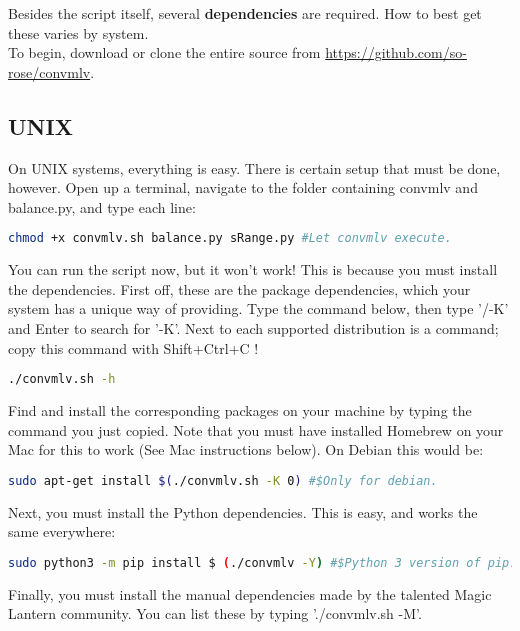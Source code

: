 \documentclass[a4paper,12pt]{article}
\begin{document}
		Besides the script itself, several \textbf{dependencies} are required. How to best get these varies by system.\\
		
		To begin, download or clone the entire source from \url{https://github.com/so-rose/convmlv}.
		
	\subsection{UNIX}
		On UNIX systems, everything is easy. There is certain setup that must be done, however. Open up a terminal, navigate to the folder containing
		convmlv and balance.py, and type each line:
		
\begin{lstlisting}[language=bash]
	chmod +x convmlv.sh balance.py sRange.py #Let convmlv execute.
\end{lstlisting}
		
		You can run the script now, but it won't work! This is because you must install the dependencies. First off, these are the package
		dependencies, which your system has a unique way of providing. Type the command below, then type '/-K' and Enter to search for '-K'.
		Next to each supported distribution is a command; copy this command with Shift+Ctrl+C !

\begin{lstlisting}[language=bash]
	./convmlv.sh -h
\end{lstlisting}

		Find and install the corresponding packages on your machine by typing the command you just copied. Note that you must have installed
		Homebrew on your Mac for this to work (See Mac instructions below). On Debian this would be:
		
\begin{lstlisting}[language=bash]
	sudo apt-get install $(./convmlv.sh -K 0) #$Only for debian.
\end{lstlisting}

		Next, you must install the Python dependencies. This is easy, and works the same everywhere:
		
\begin{lstlisting}[language=bash]
	sudo python3 -m pip install $ (./convmlv -Y) #$Python 3 version of pip.
\end{lstlisting}

		Finally, you must install the manual dependencies made by the talented Magic Lantern community. You can list these
		by typing './convmlv.sh -M'.\\
		
\end{document}
